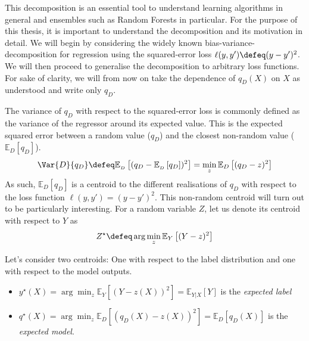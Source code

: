 \documentclass[
    a4paper, %
	fontsize=10pt, %
	twoside=false, %
]{kaobook}
\begin{document}
This decomposition is an essential tool to understand learning algorithms in general and ensembles such as Random Forests in particular. For the purpose of this thesis, it is important to understand the decomposition and its motivation in detail. 
We will begin by considering the widely known bias-variance-decomposition for regression using the squared-error loss $\ell(y, y') \defeq (y- y')^2$. We will then proceed to generalise the decomposition to arbitrary loss functions.
For sake of clarity, we will from now on take the dependence of $q_{D}(X)$ on $X$ as understood and write only $q_{D}$.

The variance of $q_{D}$ with respect to the squared-error loss is commonly defined as the variance of the regressor around its expected value. This is the expected squared error between a random value ($q_{D}$) and the closest non-random value ($\mathbb{E}_{D}\left[q_{D}\right]$). 
$$
\Var{D}{q_{D}} \defeq \mathbb{E}_{_{D}}\left[ (q_{D}- \mathbb{E}_{_{D}}\left[ q_{D} \right] )^2 \right]  = \min_{z} \mathbb{E}_{D}\left[ (q_{D} - z)^2 \right] 
$$
As such, $\mathbb{E}_{D}\left[ q_{D} \right]$ is a centroid to the different realisations of $q_{D}$ with respect to the loss function $\ell(y,y') = (y-y')^2$.
This non-random centroid will turn out to be particularly interesting. For a random variable $Z$, let us denote its centroid with respect to $Y$ as
$$
Z^\star \defeq \arg \min_{z} \mathbb{E}_Y\left[ (Y - z)^2 \right]
$$

Let's consider two centroids: One with respect to the label distribution and one with respect to the model outputs.
\begin{itemize}
\item $y^\star(X) = \arg\min_{z} \mathbb{E}_{Y}\left[ (Y - z(X))^2 \right] = \mathbb{E}_{Y|X}\left[ Y \right]$ is the \textit{expected label} %
\item $q^\star(X) = \arg \min_{z} \mathbb{E}_{D}\left[ (q_{D}(X) - z(X))^2 \right] = \mathbb{E}_D\left[q_D(X)\right]$ is the \textit{expected model}.
\end{itemize}
\end{document}

